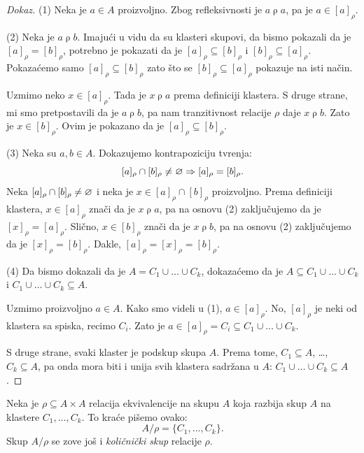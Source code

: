 \begin{proof}[Dokaz]
  (1)
  Neka je $a \in A$ proizvoljno. Zbog refleksivnosti je $a \mathrel{\rho} a$, pa je $a \in [a]_\rho$.
  
  \medskip
  
  (2)
  Neka je $a \mathrel\rho b$. Imaju\'ci u vidu da su klasteri skupovi, da bismo pokazali da je $[a]_\rho = [b]_\rho$,
  potrebno je pokazati da je $[a]_\rho \subseteq [b]_\rho$ i $[b]_\rho \subseteq [a]_\rho$. Pokaza\'cemo samo
  $[a]_\rho \subseteq [b]_\rho$ zato \v sto se $[b]_\rho \subseteq [a]_\rho$ pokazuje na isti na\v cin.
  
  Uzmimo neko $x \in [a]_\rho$. Tada je $x \mathrel\rho a$ prema definiciji klastera. S druge strane, mi smo pretpostavili
  da je $a \mathrel\rho b$, pa nam tranzitivnost relacije $\rho$ daje $x \mathrel\rho b$. Zato je $x \in [b]_\rho$.
  Ovim je pokazano da je $[a]_\rho \subseteq [b]_\rho$.
  
  \medskip
  
  (3)
  Neka su $a, b \in A$. Dokazujemo kontrapoziciju tvr\dj enja:
  $$
    [a]_\rho \cap [b]_\rho \ne \varnothing \Rightarrow  [a]_\rho = [b]_\rho.
  $$
  Neka $[a]_\rho \cap [b]_\rho \ne \varnothing$ i neka je $x \in [a]_\rho \cap [b]_\rho$ proizvoljno.
  Prema definiciji klastera, $x \in [a]_\rho$ zna\v ci da je $x \mathrel\rho a$, pa na osnovu (2) zaklju\v cujemo da je $[x]_\rho = [a]_\rho$.
  Sli\v cno, $x \in [b]_\rho$ zna\v ci da je $x \mathrel\rho b$, pa na osnovu (2) zaklju\v cujemo da je $[x]_\rho = [b]_\rho$.
  Dakle, $[a]_\rho = [x]_\rho = [b]_\rho$.

  \medskip
  
  (4)
  Da bismo dokazali da je $A = C_1 \cup \ldots \cup C_k$, dokaza\'cemo da je
  $A \subseteq C_1 \cup \ldots \cup C_k$ i $C_1 \cup \ldots \cup C_k \subseteq A$.

  Uzmimo proizvoljno $a \in A$. Kako smo videli u (1), $a \in [a]_\rho$. No, $[a]_\rho$ je neki od klastera sa spiska, recimo $C_i$.
  Zato je $a \in [a]_\rho = C_i \subseteq C_1 \cup \ldots \cup C_k$.

  S druge strane, svaki klaster je podskup skupa $A$. Prema tome, $C_1 \subseteq A$, \ldots, $C_k \subseteq A$,
  pa onda mora biti i unija svih klastera sadr\v zana u $A$: $C_1 \cup \ldots \cup C_k \subseteq A$.
\end{proof}

\begin{DEF}
  Neka je $\rho \subseteq A \times A$ relacija ekvivalencije na skupu $A$ koja razbija skup $A$ na klastere $C_1, \ldots, C_k$.
  To kra\'ce pi\v semo ovako:
  $$
    A / \rho = \{C_1, \ldots, C_k\}.
  $$
  Skup $A / \rho$ se zove jo\v s i \emph{koli\v cni\v cki skup} relacije $\rho$.
\end{DEF}

